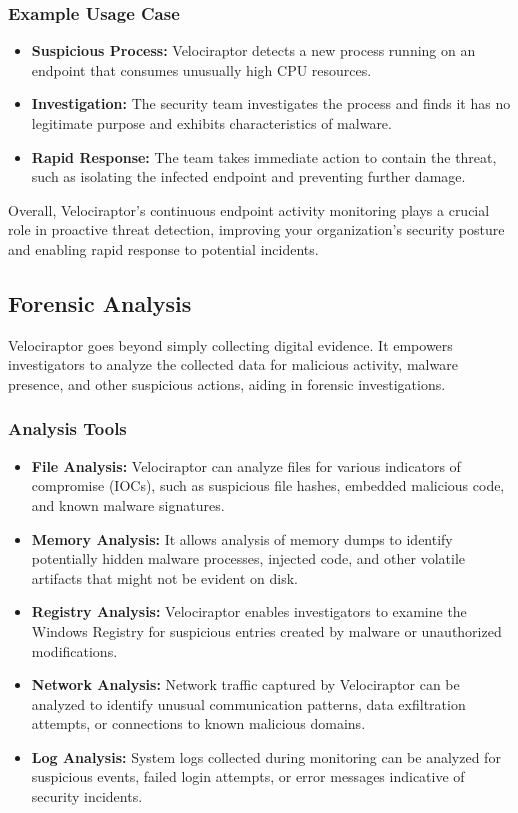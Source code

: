 \documentclass[a4paper, 11pt, oneside]{article} %
\begin{document}
\subsubsection{Example Usage Case}
\begin{itemize}
    \item \textbf{Suspicious Process: } Velociraptor detects a new process running on an endpoint that consumes unusually high CPU resources.
    \item \textbf{Investigation: }The security team investigates the process and finds it has no legitimate purpose and exhibits characteristics of malware.
    \item \textbf{Rapid Response: } The team takes immediate action to contain the threat, such as isolating the infected endpoint and preventing further damage.  
\end{itemize}
Overall, Velociraptor's continuous endpoint activity monitoring plays a crucial role in proactive threat detection, improving your organization's security posture and enabling rapid response to potential incidents.
\subsection{Forensic Analysis}
Velociraptor goes beyond simply collecting digital evidence. It empowers investigators to analyze the collected data for malicious activity, malware presence, and other suspicious actions, aiding in forensic investigations.
\subsubsection{Analysis Tools}
\begin{itemize}
    \item \textbf{File Analysis: }Velociraptor can analyze files for various indicators of compromise (IOCs), such as suspicious file hashes, embedded malicious code, and known malware signatures.
    \item \textbf{Memory Analysis: }It allows analysis of memory dumps to identify potentially hidden malware processes, injected code, and other volatile artifacts that might not be evident on disk.
    \item \textbf{Registry Analysis: } Velociraptor enables investigators to examine the Windows Registry for suspicious entries created by malware or unauthorized modifications.
    \item \textbf{Network Analysis: }Network traffic captured by Velociraptor can be analyzed to identify unusual communication patterns, data exfiltration attempts, or connections to known malicious domains.
    \item \textbf{Log Analysis: }System logs collected during monitoring can be analyzed for suspicious events, failed login attempts, or error messages indicative of security incidents.
\end{itemize}
\end{document}
